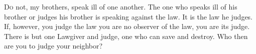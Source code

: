
\lettrine{D}{o} not, my brothers, speak ill of one another. The one who speaks ill of his brother or judges his brother is speaking against the law. It is the law he judges. If, however, you judge the law you are no observer of the law, you are its judge. There is but one Lawgiver and judge, one who can save and destroy. Who then are you to judge your neighbor?